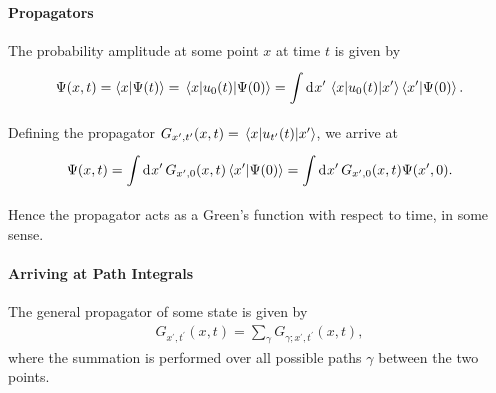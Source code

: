 \paragraph{Propagators}
The probability amplitude at some point $x$ at time $t$ is given by
\begin{align*}
	\Psi(x, t) = \braket{x}{\Psi(t)} = \mel{x}{u_{0}(t)}{\Psi(0)} = \int\limits_{}^{}\dd[]{x^{\prime}}\mel{x}{u_{0}(t)}{x^{\prime}}\braket{x^{\prime}}{\Psi(0)}.
\end{align*}
Defining the propagator $G_{x^{\prime}, t^{\prime}}(x, t) = \mel{x}{u_{t^{\prime}}(t)}{x^{\prime}}$, we arrive at
\begin{align*}
	\Psi(x, t) = \int\limits_{}^{}\dd[]{x^{\prime}}G_{x^{\prime}, 0}(x, t)\braket{x^{\prime}}{\Psi(0)} = \int\limits_{}^{}\dd[]{x^{\prime}}G_{x^{\prime}, 0}(x, t)\Psi(x^{\prime}, 0).
\end{align*}
Hence the propagator acts as a Green's function with respect to time, in some sense.

\paragraph{Arriving at Path Integrals}
The general propagator of some state is given by
\begin{align*}
	G_{x^{\prime}, t^{\prime}}(x, t) = \sum\limits_{\gamma}G_{\gamma; x^{\prime}, t^{\prime}}(x, t),
\end{align*}
where the summation is performed over all possible paths $\gamma$ between the two points.


